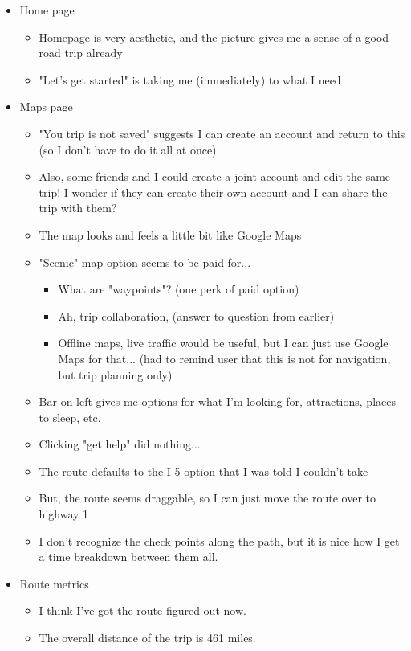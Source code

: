 \begin{itemize}
\item Home page
  \begin{itemize}
  \item Homepage is very aesthetic, and the picture gives me a sense of a good road trip already
  \item "Let's get started" is taking me (immediately) to what I need
  \end{itemize}
\item Maps page
  \begin{itemize}
  \item "You trip is not saved" suggests I can create an account and return to this (so I don't have to do it all at once)
  \item Also, some friends and I could create a joint account and edit the same trip! I wonder if they can create their own account and I can share the trip with them?
  \item The map looks and feels a little bit like Google Maps
  \item "Scenic" map option seems to be paid for...
    \begin{itemize}
    \item What are "waypoints"? (one perk of paid option)
    \item Ah, trip collaboration, (answer to question from earlier)
    \item Offline maps, live traffic would be useful, but I can just use Google Maps for that... (had to remind user that this is not for navigation, but trip planning only)
    \end{itemize}
  \item Bar on left gives me options for what I'm looking for, attractions, places to sleep, etc.
  \item Clicking "get help" did nothing...
  \item The route defaults to the I-5 option that I was told I couldn't take
  \item But, the route seems draggable, so I can just move the route over to highway 1
  \item I don't recognize the check points along the path, but it is nice how I get a time breakdown between them all.
  \end{itemize}
\item Route metrics
  \begin{itemize}
  \item I think I've got the route figured out now.
  \item The overall distance of the trip is 461 miles.

\end{itemize}
\end{itemize}
